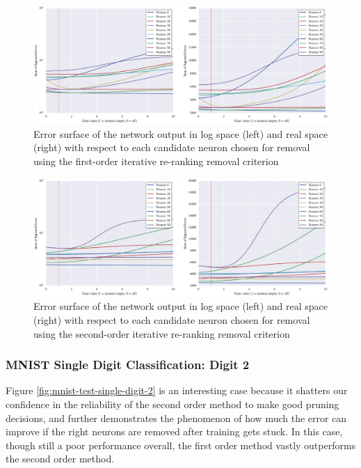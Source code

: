 \begin{figure}[!ht]
\centering
\includegraphics[width=\linewidth]{png/mnist-test-single-digit-1-g1.pdf}
\caption{Error surface of the network output in log space (left) and real space (right) with respect to each candidate neuron chosen for removal using the first-order iterative re-ranking removal criterion}
\label{fig:mnist-test-single-digit-1-g1}
\end{figure}

\begin{figure}[!ht]
\centering
\includegraphics[width=\linewidth]{png/mnist-test-single-digit-1-g2.pdf}
\caption{Error surface of the network output in log space (left) and real space (right) with respect to each candidate neuron chosen for removal using the second-order iterative re-ranking removal criterion}
\label{fig:mnist-test-single-digit-1-g2}
\end{figure}

\subsubsection{MNIST Single Digit Classification: Digit 2}

Figure \ref{fig:mnist-test-single-digit-2} is an interesting case because it shatters our confidence in the reliability of the second order method to make good pruning decisions, and further demonstrates the phenomenon of how much the error can improve if the right neurons are removed after training gets stuck. In this case, though still a poor performance overall, the first order method vastly outperforms the second order method. 

